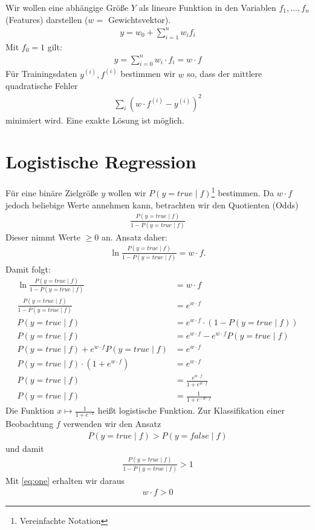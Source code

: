 Wir wollen eine abhängige Größe \(Y\) als lineare Funktion in den Variablen \(f_1,\ldots, f_n\) (Features) darstellen
(\(w =\) Gewichtsvektor).
\begin{align*}
	y=w_0+\sum\limits_{i=1}^n w_i f_i
\end{align*}
Mit \(f_0=1\) gilt:
\begin{align*}
    y=\sum\limits_{i=0}^n w_i\cdot f_i= w \cdot f
\end{align*}
Für Trainingsdaten \(y^{(i)}, f^{(i)}\) bestimmen wir \(w\) so, dass der mittlere quadratische Fehler
\begin{align*}
    \sum\limits_i {(w\cdot f^{(i)}-y^{(i)})}^2
\end{align*}
minimiert wird.
Eine exakte Lösung ist möglich.


\section{Logistische Regression}
\label{sub:logistische_regression}
Für eine binäre Zielgröße \(y\) wollen wir \(P(y=true \mid f)\)\footnote{Vereinfachte Notation} bestimmen.
Da \(w\cdot f\) jedoch beliebige Werte annehmen kann, betrachten wir den Quotienten (Odds)
\begin{align*}
	\frac{P(y=true\mid f)}{1-P(y=true\mid f)}
\end{align*}
Dieser nimmt Werte $\geq 0$ an. Ansatz daher:
\begin{align}
\ln \frac{P(y=true\mid f)}{1-P(y=true\mid f)} = w\cdot f. \tag{1}\label{eq:one}
\end{align}
Damit folgt:
\begin{align*}
	\ln \frac{P(y=true\mid f)}{1-P(y=true\mid f)} &= w\cdot f\\
	\frac{P(y=true\mid f)}{1-P(y=true\mid f)} &= e^{w\cdot f}\\
	P(y=true\mid f) &=e^{w\cdot f}\cdot (1-P(y=true\mid f))\\
	P(y=true\mid f) &=e^{w\cdot f} - e^{w\cdot f}P(y=true\mid f)\\
	P(y=true\mid f) + e^{w\cdot f}P(y=true\mid f)&=e^{w\cdot f} \\
	P(y=true\mid f)\cdot (1+ e^{w\cdot f}) &=e^{w\cdot f} \\
	P(y=true\mid f) &=\frac{e^{w\cdot f}}{1+ e^{w\cdot f}} \\
	P(y=true\mid f) &=\frac{1}{1+ e^{-w\cdot f}} \tag{2}\label{eq:two}
\end{align*}
Die Funktion \(x\mapsto \frac{1}{1+e^{-x}}\) heißt logistische Funktion.
Zur Klassifikation einer Beobachtung $f$ verwenden wir den Ansatz
\begin{align*}
	P(y=true \mid f)> P(y=false \mid f)
\end{align*}
und damit
\begin{align*}
	\frac{P(y=true\mid f)}{1-P(y=true\mid f)} > 1
\end{align*}
Mit \cref{eq:one} erhalten wir daraus
\begin{align*}
    w\cdot f>0
\end{align*}
